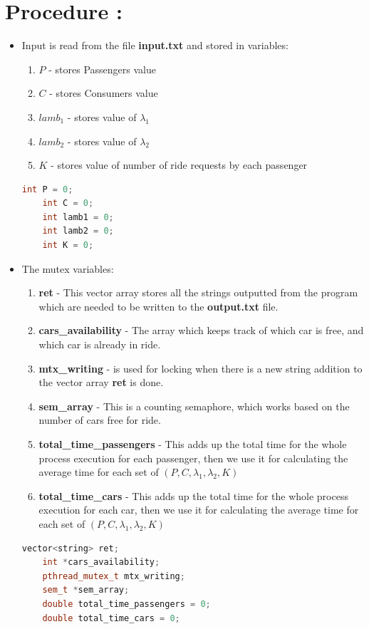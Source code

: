 \documentclass[12pt,a4paper]{article}
\begin{document}
	\section{Procedure :}
	\begin{itemize}
	\item Input is read from the file \textbf{input.txt} and stored in variables:
	\begin{enumerate}
		\item $P$ - stores Passengers value
		\item $C$ - stores Consumers value
		\item $lamb_1$ - stores value of $\lambda_1$
		\item $lamb_2$ - stores value of $\lambda_2$
		\item $K$ - stores value of number of ride requests by each passenger
	\end{enumerate}
	\begin{lstlisting}[language=C++, style = mystyle]
	int P = 0; 
	int C = 0; 
	int lamb1 = 0;
	int lamb2 = 0;
	int K = 0;
\end{lstlisting}
	\item The mutex variables: 
\begin{enumerate}
	\item \textbf{ret} - This vector array stores all the strings outputted from the program which are needed to be written to the \textbf{output.txt} file.
	\item \textbf{cars\_availability} - The array which keeps track of which car is free, and which car is already in ride. 
	\item \textbf{mtx\_writing} - is used for locking when there is a new string addition to the vector array \textbf{ret} is done.
	\item \textbf{sem\_array} - This is a counting semaphore, which works based on the number of cars free for ride.
	\item \textbf{total\_time\_passengers} - This adds up the total time for the whole process execution for each passenger, then we use it for calculating the average time for each set of $(P,C,\lambda_1,\lambda_2,K)$
	\item \textbf{total\_time\_cars} - This adds up the total time for the whole process execution for each car, then we use it for calculating the average time for each set of $(P,C,\lambda_1,\lambda_2,K)$

\end{enumerate}
	\begin{lstlisting}[language=C++, style = mystyle,label={lst:2}]
	vector<string> ret;
	int *cars_availability;
	pthread_mutex_t mtx_writing;      
	sem_t *sem_array;                 
	double total_time_passengers = 0;  
	double total_time_cars = 0;  
	\end{lstlisting}


\end{itemize}
\end{document}
